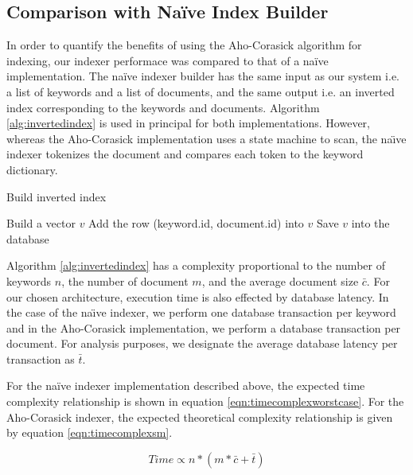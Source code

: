 \documentclass[10pt]{article}
\begin{document}
\subsection{Comparison with Na\"{i}ve Index Builder}
\label{sec:naive}
In order to quantify the benefits of using the Aho-Corasick algorithm
for indexing, our indexer performace was compared to that of a
na\"{i}ve implementation. The na\"{i}ve indexer builder has the same
input as our system i.e. a list of keywords and a list of documents,
and the same output i.e. an inverted index corresponding to the
keywords and documents. Algorithm \ref{alg:invertedindex} is used in
principal for both implementations. However, whereas the Aho-Corasick
implementation uses a state machine to scan, the na\"{\i}ve
indexer tokenizes the document and compares each token to the keyword
dictionary. 


\begin{algorithm}
\caption{Build inverted index}
\label{alg:invertedindex}
\begin{algorithmic}
  \STATE Build a vector $v$
  \STATE Add the row (keyword.id, document.id) into $v$
  \ENDFOR
  \STATE Save $v$ into the database
  \ENDFOR
\end{algorithmic}
\end{algorithm}

Algorithm \ref{alg:invertedindex} has a complexity proportional to the
number of keywords $n$, the number of document $m$, and the average
document size $\bar{c}$. For our chosen architecture, execution time
is also effected by database latency. In the case of the
na\"{\i}ve indexer, we perform one database transaction per keyword
and in the Aho-Corasick implementation, we perform a database
transaction per document. For analysis purposes, we designate the
average database latency per transaction as $\bar{t}$. 

For the na\"{i}ve indexer implementation described above, the expected
time complexity relationship is shown in equation
\ref{eqn:timecomplexworstcase}. For the Aho-Corasick indexer, the
expected theoretical complexity relationship is given by equation
\ref{eqn:timecomplexsm}.  

\begin{equation}
\label{eqn:timecomplexworstcase}
Time \propto n * ( m * \bar{c} + \bar{t} )
\end{equation}
\end{document}
